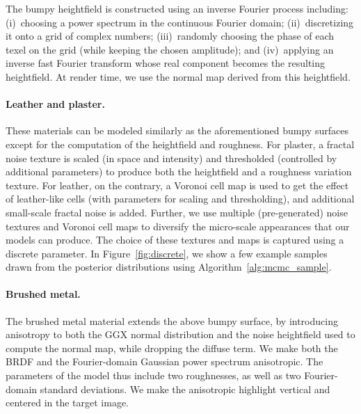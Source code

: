 The bumpy heightfield is constructed using an inverse Fourier process including: (i)~choosing a power spectrum in the continuous Fourier domain; (ii)~discretizing it onto a grid of complex numbers; (iii)~randomly choosing the phase of each texel on the grid (while keeping the chosen amplitude); and (iv)~applying an inverse fast Fourier transform whose
real component becomes the resulting heightfield.
At render time, we use the normal map derived from this heightfield.

\paragraph*{Leather and plaster.}
These materials can be modeled similarly as the aforementioned bumpy surfaces except for the computation of the heightfield and roughness.
For plaster, a fractal noise texture is scaled (in space and intensity) and thresholded (controlled by additional parameters) to produce both the heightfield and a roughness variation texture. For leather, on the contrary, a Voronoi cell map is used to get the effect of leather-like cells (with parameters for scaling and thresholding), and additional small-scale fractal noise is added.
Further, we use multiple (pre-generated) noise textures and Voronoi cell maps to diversify the micro-scale appearances that our models can produce.
The choice of these textures and maps is captured using a discrete parameter.
In Figure~\ref{fig:discrete}, we show a few example samples drawn from the posterior distributions using Algorithm~\ref{alg:mcmc_sample}.

\paragraph*{Brushed metal.} The brushed metal material extends the above bumpy surface, by introducing anisotropy to both the GGX normal distribution and the noise heightfield used to compute the normal map, while dropping the diffuse term. We make both the BRDF and the Fourier-domain Gaussian power spectrum anisotropic. The parameters of the model thus include two roughnesses, as well as two Fourier-domain standard deviations.  We make the anisotropic highlight vertical and centered in the target image.

